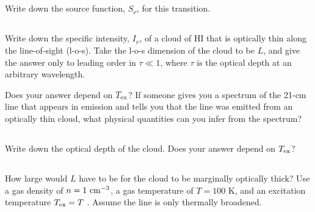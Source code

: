 \documentclass[11pt]{article}
\begin{document}
\subsection{}
Write down the source function, $S_\nu$, for this transition.

\subsection{}
Write down the specific intensity, $I_\nu$, of a cloud of HI that is optically
thin along the line-of-sight (l-o-s). Take the l-o-s dimension of the cloud to
be $L$, and give the answer only to leading order in $\tau\ll1$, where $\tau$ is the
optical depth at an arbitrary wavelength.

Does your answer depend on ${T_{\rm ex}}$?  If someone gives you a spectrum of the 21-cm
line that appears in emission and tells you that the line was emitted from an
optically thin cloud, what physical quantities can you infer from the spectrum?

\subsection{}
Write down the optical depth of the cloud. Does your answer depend on ${T_{\rm ex}}$?

\subsection{}
How large would $L$ have to be for the cloud to be marginally optically
thick? Use a gas density of $n=1~{\rm cm}^{-3}$, a gas temperature of $T = 100$ K, and an
excitation temperature ${T_{\rm ex}} = T$ . Assume the line is only thermally broadened.
\end{document}
